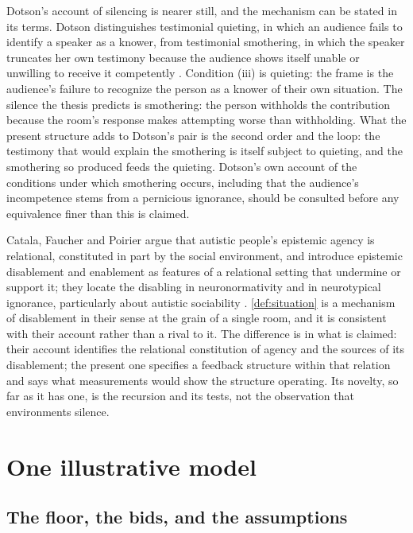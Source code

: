 Dotson's account of silencing is nearer still, and the mechanism can be stated in its terms. Dotson distinguishes testimonial quieting, in which an audience fails to identify a speaker as a knower, from testimonial smothering, in which the speaker truncates her own testimony because the audience shows itself unable or unwilling to receive it competently \cite{Dotson2011}. Condition (iii) is quieting: the frame is the audience's failure to recognize the person as a knower of their own situation. The silence the thesis predicts is smothering: the person withholds the contribution because the room's response makes attempting worse than withholding. What the present structure adds to Dotson's pair is the second order and the loop: the testimony that would explain the smothering is itself subject to quieting, and the smothering so produced feeds the quieting. Dotson's own account of the conditions under which smothering occurs, including that the audience's incompetence stems from a pernicious ignorance, should be consulted before any equivalence finer than this is claimed.

Catala, Faucher and Poirier argue that autistic people's epistemic agency is relational, constituted in part by the social environment, and introduce epistemic disablement and enablement as features of a relational setting that undermine or support it; they locate the disabling in neuronormativity and in neurotypical ignorance, particularly about autistic sociability \cite{Catala2021}. \autoref{def:situation} is a mechanism of disablement in their sense at the grain of a single room, and it is consistent with their account rather than a rival to it. The difference is in what is claimed: their account identifies the relational constitution of agency and the sources of its disablement; the present one specifies a feedback structure within that relation and says what measurements would show the structure operating. Its novelty, so far as it has one, is the recursion and its tests, not the observation that environments silence.

\section{One illustrative model}\label{sec:model}

\subsection{The floor, the bids, and the assumptions}


